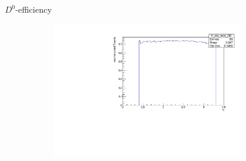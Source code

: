 \documentclass[11pt]{beamer}
\begin{document}
\begin{frame}{$D^0$-efficiency}
\begin{figure}
\begin{subfigure}{0.45\textwidth}
\end{subfigure}
\begin{subfigure}{0.45\textwidth}
\includegraphics[width=0.9\textwidth]{up_pdf/h_eta_reco_D0.pdf}
\end{subfigure}
\end{figure}
\end{frame}
\end{document}
